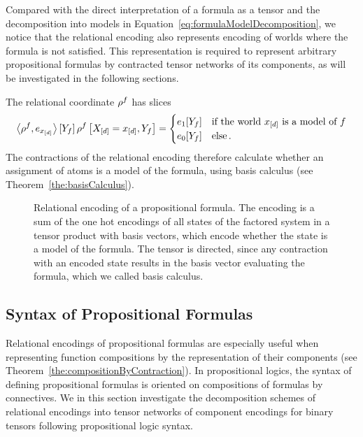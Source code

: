 Compared with the direct interpretation of a formula as a tensor and the decomposition into models in Equation~\ref{eq:formulaModelDecomposition}, we notice that the relational encoding also represents encoding of worlds where the formula is not satisfied.
This representation is required to represent arbitrary propositional formulas by contracted tensor networks of its components, as will be investigated in the following sections.


The relational coordinate $\rho^{f}$ has slices
\begin{align}
	\left\langle \rho^{f},e_{x_{[d]}}\right\rangle \left[ Y_{f} \right] 
		\rho^{f}\left[X_{[d]}=x_{[d]},Y_{f}\right]
	= \begin{cases}
		e_1[Y_{f}] & \text{if the world $x_{[d]}$ is a model of $f$}  \\
		e_0[Y_{f}] & \text{else}\, .
		\end{cases}
\end{align} 
The contractions of the relational encoding therefore calculate whether an assignment of atoms is a model of the formula, using basis calculus (see Theorem~\ref{the:basisCalculus}).

\begin{figure}[h]
\begin{center}
	
\end{center}
\caption{Relational encoding of a propositional formula. 
The encoding is a sum of the one hot encodings of all states of the factored system in a tensor product with basis vectors, which encode whether the state is a model of the formula.
The tensor is directed, since any contraction with an encoded state results in the basis vector evaluating the formula, which we called basis calculus.
}
\label{fig:formulaRencoding} 
\end{figure}










\subsection{Syntax of Propositional Formulas}

Relational encodings of propositional formulas are especially useful when representing function compositions by the representation of their components (see Theorem~\ref{the:compositionByContraction}). 
In propositional logics, the syntax of defining propositional formulas is oriented on compositions of formulas by connectives. %
We in this section investigate the decomposition schemes of relational encodings into tensor networks of component encodings for binary tensors following propositional logic syntax.

